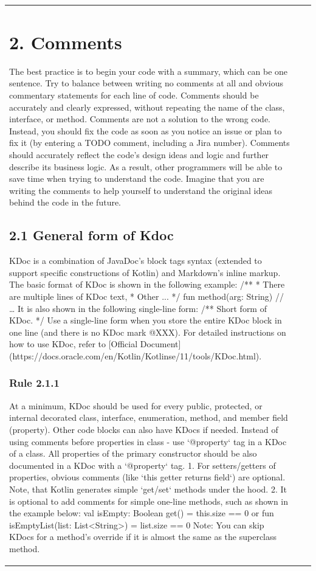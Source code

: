 \begin{center}
\begin{tabular}{ |p{}|p{}|p{}| }
\section*{\textbf{2. Comments}}
The best practice is to begin your code with a summary, which can be one sentence.
Try to balance between writing no comments at all and obvious commentary statements for each line of code.
Comments should be accurately and clearly expressed, without repeating the name of the class, interface, or method.
Comments are not a solution to the wrong code. Instead, you should fix the code as soon as you notice an issue or plan to fix it (by entering a TODO comment, including a Jira number).
Comments should accurately reflect the code's design ideas and logic and further describe its business logic.
As a result, other programmers will be able to save time when trying to understand the code.
Imagine that you are writing the comments to help yourself to understand the original ideas behind the code in the future.
\subsection*{\textbf{2.1 General form of Kdoc}}
KDoc is a combination of JavaDoc's block tags syntax (extended to support specific constructions of Kotlin) and Markdown's inline markup.
The basic format of KDoc is shown in the following example:
 /**
 * There are multiple lines of KDoc text,
 * Other ...
 */
fun method(arg: String) {
    // …
}
It is also shown in the following single-line form:
 /** Short form of KDoc. */
Use a single-line form when you store the entire KDoc block in one line (and there is no KDoc mark @XXX). For detailed instructions on how to use KDoc, refer to [Official Document](https://docs.oracle.com/en/Kotlin/Kotlinse/11/tools/KDoc.html).
\subsubsection*{\textbf{Rule 2.1.1}}
At a minimum, KDoc should be used for every public, protected, or internal decorated class, interface, enumeration, method, and member field (property). Other code blocks can also have KDocs if needed.
Instead of using comments before properties in class - use `@property` tag in a KDoc of a class.
All properties of the primary constructor should be also documented in a KDoc with a `@property` tag.
1. For setters/getters of properties, obvious comments (like `this getter returns field`) are optional. Note, that Kotlin generates simple `get/set` methods under the hood.
2. It is optional to add comments for simple one-line methods, such as shown in the example below:
val isEmpty: Boolean
    get() = this.size == 0
or
fun isEmptyList(list: List<String>) = list.size == 0
Note: You can skip KDocs for a method's override if it is almost the same as the superclass method.

\end{tabular}
\end{center}
